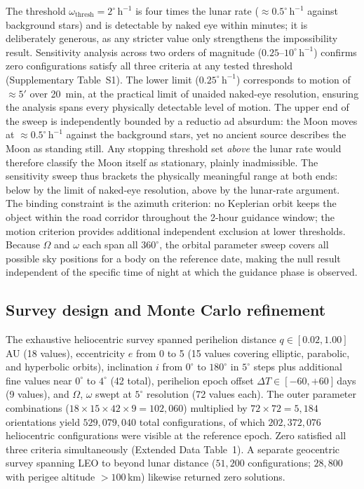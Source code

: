 \documentclass[sn-nature]{sn-jnl}
\begin{document}
The threshold $\omega_\text{thresh}=2^\circ\,\mathrm{h}^{-1}$ is four
times the lunar rate (${\approx}0.5^\circ\,\mathrm{h}^{-1}$ against background
stars) and is detectable by naked eye within minutes; it is deliberately
generous, as any stricter value only strengthens the impossibility result.
Sensitivity analysis across two orders of magnitude ($0.25$--$10^\circ\,\mathrm{h}^{-1}$)
confirms zero configurations satisfy all three criteria at any tested threshold
(Supplementary Table~S1). The lower limit ($0.25^\circ\,\mathrm{h}^{-1}$)
corresponds to motion of ${\approx}5'$ over 20~min, at the practical limit of
unaided naked-eye resolution, ensuring the analysis spans every physically
detectable level of motion.
The upper end of the sweep is independently bounded by a reductio ad absurdum:
the Moon moves at ${\approx}0.5^\circ\,\mathrm{h}^{-1}$ against the background
stars, yet no ancient source describes the Moon as standing still.
Any stopping threshold set \emph{above} the lunar rate would therefore classify
the Moon itself as stationary, plainly inadmissible.
The sensitivity sweep thus brackets the physically meaningful range at both ends:
below by the limit of naked-eye resolution, above by the lunar-rate argument.
The binding constraint is the azimuth
criterion: no Keplerian orbit keeps the object within the road corridor
throughout the 2-hour guidance window; the motion criterion provides
additional independent exclusion at lower thresholds.
Because $\Omega$ and $\omega$ each span all $360^\circ$, the orbital parameter
sweep covers all possible sky positions for a body on the reference date,
making the null result independent of the specific time of night at which the
guidance phase is observed.

\subsection{Survey design and Monte Carlo refinement}

The exhaustive heliocentric survey spanned perihelion distance $q\in[0.02,
1.00]$\,AU (18 values), eccentricity $e$ from 0 to 5 (15 values covering
elliptic, parabolic, and hyperbolic orbits), inclination $i$ from $0^\circ$
to $180^\circ$ in $5^\circ$ steps plus additional fine values near $0^\circ$
to $4^\circ$ (42 total), perihelion epoch offset $\Delta T\in[-60,+60]$\,days
(9 values), and $\Omega$, $\omega$ swept at $5^\circ$ resolution (72 values
each). The outer parameter combinations ($18\times15\times42\times9 =
102{,}060$) multiplied by $72\times72=5{,}184$ orientations yield
$529{,}079{,}040$ total configurations, of which $202{,}372{,}076$ heliocentric configurations were
visible at the reference epoch. Zero satisfied all three criteria
simultaneously (Extended Data Table~1). A separate geocentric survey
spanning LEO to beyond lunar distance ($51{,}200$ configurations;
$28{,}800$ with perigee altitude $>100$\,km) likewise returned zero
solutions.
\end{document}
